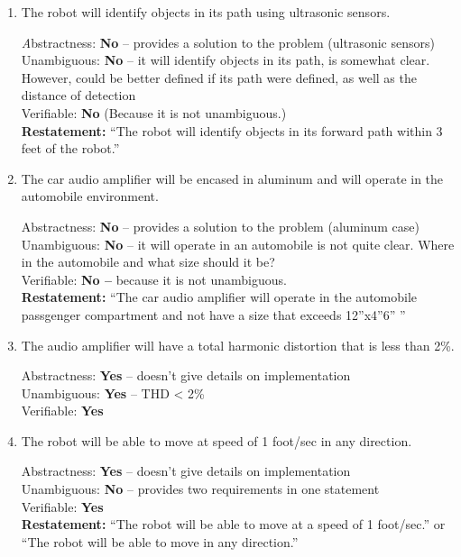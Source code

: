 \begin{enumerate}
\begin{enumerate}
  
\item
  The robot will identify objects in its path using ultrasonic sensors.
\begin{onlysolution}
\textit
Abstractness: \textbf{No} -- provides a solution to the problem (ultrasonic sensors)\\
Unambiguous: \textbf{No} -- it will identify objects in its path, is
somewhat clear. However, could be better defined if its path were
defined, as well as the distance of detection\\
Verifiable: \textbf{No} (Because it is not unambiguous.)\\
\textbf{Restatement:} ``The robot will identify objects in its forward
path within 3 feet of the robot.''
\end{onlysolution}

\item
  The car audio amplifier will be encased in aluminum and will operate
  in the automobile environment.
  \begin{onlysolution}
Abstractness: \textbf{No} -- provides a solution to the problem (aluminum case)\\
Unambiguous: \textbf{No} -- it will operate in an automobile is not
quite clear. Where in the automobile and what size should it be?\\
Verifiable: \textbf{No --} because it is not unambiguous.\\
\textbf{Restatement:} ``The car audio amplifier will operate in the
automobile passgenger compartment and not have a size that exceeds
12''x4''6'' ''
\end{onlysolution}

\item
  The audio amplifier will have a total harmonic distortion that is less
  than 2\%.
  \begin{onlysolution}
Abstractness: \textbf{Yes} -- doesn't give details on implementation \\
Unambiguous: \textbf{Yes} -- THD \textless{} 2\%  \\
Verifiable: \textbf{Yes}
\end{onlysolution}

\item
  The robot will be able to move at speed of 1 foot/sec in any
  direction.
  \begin{onlysolution}
Abstractness: \textbf{Yes} -- doesn't give details on implementation \\
Unambiguous: \textbf{No} -- provides two requirements in one statement \\
Verifiable: \textbf{Yes} \\
\textbf{Restatement:} ``The robot will be able to move at a speed of 1 foot/sec.'' or
``The robot will be able to move in any direction.''
\end{onlysolution}


\end{enumerate}
\end{enumerate}
